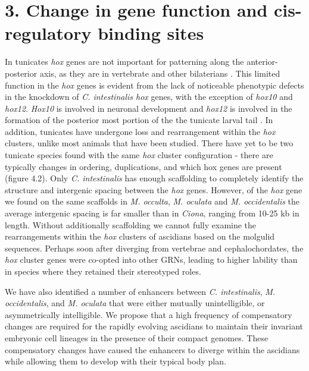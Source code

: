 \section{3.	Change in gene function and cis-regulatory binding sites}
In tunicates \textit{hox} genes are not important for patterning along the anterior-posterior axis, as they are in vertebrate and other bilaterians \cite{finnerty_origins_2003,mallo_regulation_2013,ikuta_limited_2010}. This limited function in the \textit{hox} genes is evident from the lack of noticeable phenotypic defects in the knockdown of \textit{C. intestinalis hox} genes, with the exception of \textit{hox10} and \textit{hox12}. \textit{Hox10} is involved in neuronal development and \textit{hox12} is involved in the formation of the posterior most portion of the the tunicate larval tail \cite{ikuta_limited_2010}. In addition, tunicates have undergone loss and rearrangement within the \textit{hox} clusters, unlike most animals that have been studied\cite{ikuta_organization_2005}. There have yet to be two tunicate species found with the same \textit{hox} cluster configuration - there are typically changes in ordering, duplications, and which hox genes are present (figure 4.2). Only \textit{C. intestinalis} has enough scaffolding to completely identify the structure and intergenic spacing between the \textit{hox} genes. However, of the \textit{hox} gene we found on the same scaffolds in \textit{M. occulta}, \textit{M. oculata} and \textit{M. occidentalis} the average intergenic spacing is far smaller than in {\em Ciona}, ranging from 10-25 kb in length. Without additionally scaffolding we cannot fully examine the rearrangements within the \textit{hox} clusters of ascidians based on the molgulid sequences. Perhaps soon after diverging from vertebrae and cephalochordates, the \textit{hox} cluster genes were co-opted into other GRNs, leading to higher lability than in species where they retained their stereotyped roles.

We have also identified a number of enhancers between \textit{C. intestinalis}, \textit{M. occidentalis}, and \textit{M. oculata} that were either mutually unintelligible, or asymmetrically intelligible. We propose that a high frequency of compensatory changes are required for the rapidly evolving ascidians to maintain their invariant embryonic cell lineages in the presence of their compact genomes. These compensatory changes have caused the enhancers to diverge within the ascidians while allowing them to develop with their typical body plan.

